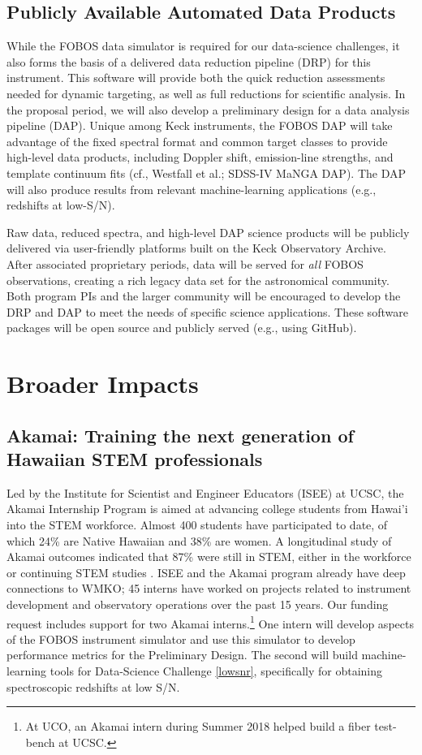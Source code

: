 \documentclass[oneside,11pt]{amsart}
\begin{document}
\subsection{Publicly Available Automated Data Products}
\label{sec:DAP}

While the FOBOS data simulator is required for our data-science challenges, it also forms the basis of a delivered data
reduction pipeline (DRP) for this instrument.  This software will provide both the quick reduction assessments needed
for dynamic targeting, as well as full reductions for scientific analysis.  In the proposal period, we will also develop a preliminary design for a data analysis
pipeline (DAP).  Unique among Keck instruments, the FOBOS DAP will take advantage of the fixed spectral format and common target classes to provide high-level data products, including
Doppler shift, emission-line strengths, and template continuum fits (cf.,
Westfall et al.; SDSS-IV MaNGA DAP).  The DAP will also produce results from relevant machine-learning applications (e.g., redshifts at low-S/N).

Raw data, reduced spectra, and high-level DAP science products will be
publicly delivered via user-friendly platforms built on the Keck Observatory Archive.  After associated
proprietary periods, data will be served for {\it all} FOBOS observations, creating a rich legacy data set for the astronomical community.  Both program PIs
and the larger community will be encouraged to develop the DRP and DAP
to meet the needs of specific science applications.  These software
packages will be open source and publicly served (e.g., using GitHub).

\section{Broader Impacts}
\label{sec:bi}

\subsection{Akamai: Training the next generation of Hawaiian STEM
professionals} Led by the Institute for Scientist and Engineer Educators
(ISEE) at UCSC, the Akamai Internship Program is aimed at advancing
college students from Hawai'i into the STEM workforce.  Almost 400
students have participated to date, of which 24\% are Native Hawaiian
and 38\% are women. A longitudinal study of Akamai outcomes indicated
that 87\% were still in STEM, either in the workforce or continuing STEM
studies \citep{asee_peer_31030}.  ISEE and the Akamai program already have deep connections to WMKO; 45 interns have
worked on projects related to instrument
development and observatory operations over the past 15 years.  Our
funding request includes support for two Akamai interns.\footnote{
%
At UCO, an Akamai intern during Summer 2018 helped build a fiber
test-bench at UCSC.}
%
One intern will develop aspects of the FOBOS instrument simulator and use this simulator to develop performance metrics
for the Preliminary Design.  The second will build machine-learning tools for Data-Science Challenge \ref{lowsnr},
specifically for obtaining spectroscopic redshifts at low S/N.
\end{document}

